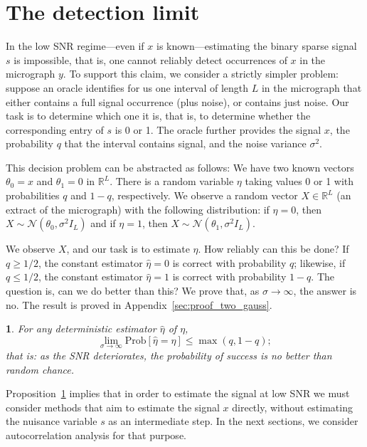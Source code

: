 \documentclass[12pt]{article}
\newcommand{\1}{\mathbf{1}}
\renewcommand{\P}{\mathrm{Prob}}
\theoremstyle{plain}
\theoremstyle{definition}
\theoremstyle{remark}
\theoremstyle{plain}
\theoremstyle{remark}
\theoremstyle{plain}
\theoremstyle{plain}
\newtheorem{proposition}[thm]{\protect\propositionname}
\providecommand{\propositionname}{Proposition}
\begin{document}
\section{The detection limit} \label{sec:detectionlimit}

In the low SNR regime---even if $x$ is known---estimating the binary sparse signal $s$ is impossible, that is, one cannot reliably detect occurrences of $x$ in the micrograph $y$.
To support this claim, we consider a strictly simpler problem: suppose an oracle identifies for us one interval of length $L$ in the micrograph that either contains a full signal occurrence (plus noise), or contains just noise. Our task is to determine which one it is, that is, to determine whether the corresponding entry of $s$ is 0 or 1.
The oracle further provides the signal $x$, the probability $q$ that  the interval contains signal, and the noise variance $\sigma^2$. 

This decision problem can be abstracted as follows: We have two known vectors $\theta_0 = x$ and $\theta_1 = 0$ in $\mathbb{R}^L$. There is a random variable $\eta$ taking values 0 or 1 with probabilities $q$ and $1-q$, respectively. We observe a random vector $X \in \mathbb{R}^L$ (an extract of the micrograph) with the following distribution: if $\eta = 0$, then $X \sim \mathcal N(\theta_0,\sigma^2I_L)$ and if $\eta = 1$, then $X \sim \mathcal N(\theta_1,\sigma^2I_L)$. 

We observe $X$, and our task is to estimate $\eta$. How reliably can this be done? If $q \geq 1/2$, the constant estimator $\hat{\eta} = 0$ is correct with probability $q$; likewise, if $q \leq 1/2$, the constant estimator $\hat{\eta} = 1$ is correct with probability $1-q$. The question is, can we do better than this?  We prove that, as $\sigma \to \infty$, the answer is no. The result is proved in Appendix~\ref{sec:proof_two_gauss}.

\begin{proposition} \label{prop:two_gauss}
	For any deterministic estimator $\hat{\eta }$ of $\eta$,
	\begin{equation}
	\lim_{\sigma \to \infty} \P[ \hat{\eta} = \eta  ] \leq \max(q, 1-q);
	\end{equation}
	that is: as the SNR deteriorates, the probability of success is no better than random chance.
\end{proposition}

Proposition~\ref{prop:two_gauss} implies that in order to estimate the signal at low SNR we must consider methods that aim to estimate the signal $x$ directly, without estimating the nuisance variable $s$ as an intermediate step.
In the next sections, we consider autocorrelation analysis for that purpose.
\end{document}

